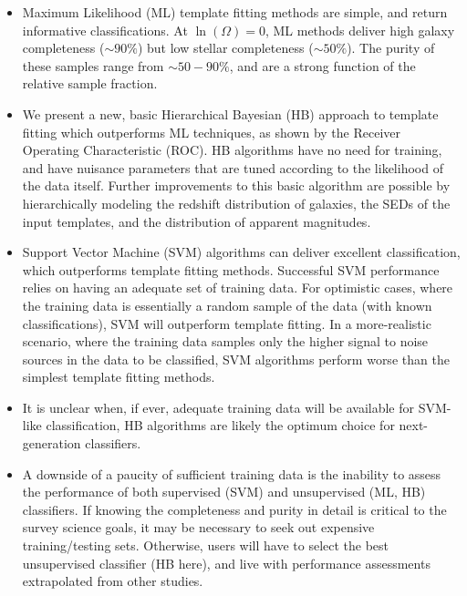 \documentclass[12pt,preprint]{aastex}
\begin{document}
\begin{itemize}

\item Maximum Likelihood (ML) template fitting methods are simple, and
  return informative classifications.  At $\ln(\Omega)=0$, ML methods
  deliver high galaxy completeness ($\sim90\%$) but low stellar
  completeness ($\sim50\%$).  The purity of these samples range from
  $\sim50-90\%$, and are a strong function of the relative sample
  fraction.

\item We present a new, basic Hierarchical Bayesian (HB) approach to template
  fitting which outperforms ML techniques, as shown by the Receiver
  Operating Characteristic (ROC).  HB algorithms have no need for training, 
  and have nuisance parameters that are tuned according to the likelihood 
  of the data itself.  Further improvements to this basic algorithm are possible by
  hierarchically modeling the redshift distribution of galaxies, the
  SEDs of the input templates, and the distribution of apparent
  magnitudes.

\item Support Vector Machine (SVM) algorithms can deliver excellent
  classification, which outperforms template fitting methods.
  Successful SVM performance relies on having an adequate set of
  training data.  For optimistic cases, where the training data is
  essentially a random sample of the data (with known
  classifications), SVM will outperform template fitting.  In a
  more-realistic scenario, where the training data samples only the
  higher signal to noise sources in the data to be classified, SVM
  algorithms perform worse than the simplest template fitting methods.

\item It is unclear when, if ever, adequate training data
  will be available for SVM-like classification, HB algorithms are 
  likely the optimum choice for next-generation classifiers.

\item A downside of a paucity of sufficient training data is the
  inability to assess the performance of both supervised (SVM) and
  unsupervised (ML, HB) classifiers.  If knowing the completeness and
  purity in detail is critical to the survey science goals, it may be
  necessary to seek out expensive training/testing sets.  Otherwise,
  users will have to select the best unsupervised classifier (HB
  here), and live with performance assessments extrapolated from other
  studies.


\end{itemize}
\end{document}

